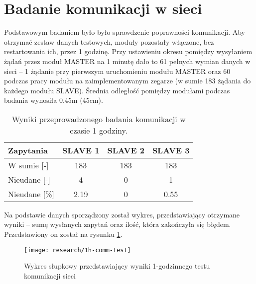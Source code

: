 \section{\label{sect:network-comm}Badanie komunikacji w sieci} Podstawowym badaniem było było sprawdzenie poprawności
komunikacji. Aby otrzymać zestaw danych testowych, moduły pozostały włączone, bez restartowania ich, przez 1 godzinę.
Przy ustawieniu okresu pomiędzy wysyłaniem żądań przez moduł MASTER na 1 minutę dało to 61 pełnych wymian danych w sieci
-- 1 żądanie przy pierwszym uruchomieniu modułu MASTER oraz 60 podczas pracy modułu na zaimplementowanym zegarze (w
sumie 183 żądania do każdego modułu SLAVE). Średnia odległość pomiędzy modułami podczas badania wynosiła 0.45m (45cm).

\begin{table}[!htbp]
    \centering
    \caption{\label{tab:1h-comm-test}Wyniki przeprowadzonego badania komunikacji w czasie 1 godziny.}
    \begin{tabular}{@{}lccc@{}}
        \toprule
        Zapytania         & \multicolumn{1}{l}{SLAVE 1} & \multicolumn{1}{l}{SLAVE 2} & \multicolumn{1}{l}{SLAVE 3} \\ \midrule
        W sumie {[}-{]}   & 183                         & 183                         & 183                         \\
        Nieudane {[}-{]}  & 4                           & 0                           & 1                           \\
        Nieudane {[}\%{]} & 2.19                        & 0                           & 0.55                        \\ \bottomrule
    \end{tabular}
\end{table}

Na podstawie danych sporządzony został wykres, przedstawiający otrzymane wyniki  -- sumę wysłanych zapytań oraz ilość,
która zakończyła się błędem. Przedstawiony on został na rysunku \ref{img:1h-comm-test}.

\begin{figure}[!htbp]
    \centering
    \texttt{[image: research/1h-comm-test]}
    \caption{\label{img:1h-comm-test}Wykres słupkowy przedstawiający wyniki 1-godzinnego testu komunikacji sieci}
\end{figure}

